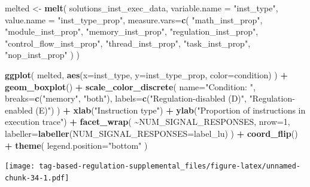 \documentclass[
]{book}
\newenvironment{Shaded}{\begin{snugshade}}{\end{snugshade}}
\newcommand{\DataTypeTok}[1]{\textcolor[rgb]{0.13,0.29,0.53}{#1}}
\newcommand{\DecValTok}[1]{\textcolor[rgb]{0.00,0.00,0.81}{#1}}
\newcommand{\KeywordTok}[1]{\textcolor[rgb]{0.13,0.29,0.53}{\textbf{#1}}}
\newcommand{\NormalTok}[1]{#1}
\newcommand{\OperatorTok}[1]{\textcolor[rgb]{0.81,0.36,0.00}{\textbf{#1}}}
\newcommand{\StringTok}[1]{\textcolor[rgb]{0.31,0.60,0.02}{#1}}
\begin{document}
\begin{Shaded}
\begin{Highlighting}[]
\NormalTok{melted \textless{}{-}}\StringTok{ }\KeywordTok{melt}\NormalTok{(}
\NormalTok{  solutions\_inst\_exec\_data,}
  \DataTypeTok{variable.name =} \StringTok{"inst\_type"}\NormalTok{,}
  \DataTypeTok{value.name =} \StringTok{"inst\_type\_prop"}\NormalTok{,}
  \DataTypeTok{measure.vars=}\KeywordTok{c}\NormalTok{(}
    \StringTok{"math\_inst\_prop"}\NormalTok{,}
    \StringTok{"module\_inst\_prop"}\NormalTok{,}
    \StringTok{"memory\_inst\_prop"}\NormalTok{,}
    \StringTok{"regulation\_inst\_prop"}\NormalTok{,}
    \StringTok{"control\_flow\_inst\_prop"}\NormalTok{,}
    \StringTok{"thread\_inst\_prop"}\NormalTok{,}
    \StringTok{"task\_inst\_prop"}\NormalTok{,}
    \StringTok{"nop\_inst\_prop"}
\NormalTok{  )}
\NormalTok{)}

\KeywordTok{ggplot}\NormalTok{( melted, }\KeywordTok{aes}\NormalTok{(}\DataTypeTok{x=}\NormalTok{inst\_type, }\DataTypeTok{y=}\NormalTok{inst\_type\_prop, }\DataTypeTok{color=}\NormalTok{condition) ) }\OperatorTok{+}
\StringTok{  }\KeywordTok{geom\_boxplot}\NormalTok{() }\OperatorTok{+}
\StringTok{  }\KeywordTok{scale\_color\_discrete}\NormalTok{(}
    \DataTypeTok{name=}\StringTok{"Condition: "}\NormalTok{,}
    \DataTypeTok{breaks=}\KeywordTok{c}\NormalTok{(}\StringTok{"memory"}\NormalTok{, }\StringTok{"both"}\NormalTok{),}
    \DataTypeTok{labels=}\KeywordTok{c}\NormalTok{(}\StringTok{"Regulation{-}disabled (D)"}\NormalTok{, }\StringTok{"Regulation{-}enabled (E)"}\NormalTok{)}
\NormalTok{  ) }\OperatorTok{+}
\StringTok{  }\KeywordTok{xlab}\NormalTok{(}\StringTok{"Instruction type"}\NormalTok{) }\OperatorTok{+}
\StringTok{  }\KeywordTok{ylab}\NormalTok{(}\StringTok{"Proportion of instructions in execution trace"}\NormalTok{) }\OperatorTok{+}
\StringTok{  }\KeywordTok{facet\_wrap}\NormalTok{(}
    \OperatorTok{\textasciitilde{}}\NormalTok{NUM\_SIGNAL\_RESPONSES,}
    \DataTypeTok{nrow=}\DecValTok{1}\NormalTok{,}
    \DataTypeTok{labeller=}\KeywordTok{labeller}\NormalTok{(}\DataTypeTok{NUM\_SIGNAL\_RESPONSES=}\NormalTok{label\_lu)}
\NormalTok{  ) }\OperatorTok{+}
\StringTok{  }\KeywordTok{coord\_flip}\NormalTok{() }\OperatorTok{+}
\StringTok{  }\KeywordTok{theme}\NormalTok{(}
    \DataTypeTok{legend.position=}\StringTok{"bottom"}
\NormalTok{  )}
\end{Highlighting}
\end{Shaded}

\texttt{[image: tag-based-regulation-supplemental\_files/figure-latex/unnamed-chunk-34-1.pdf]}
\end{document}
